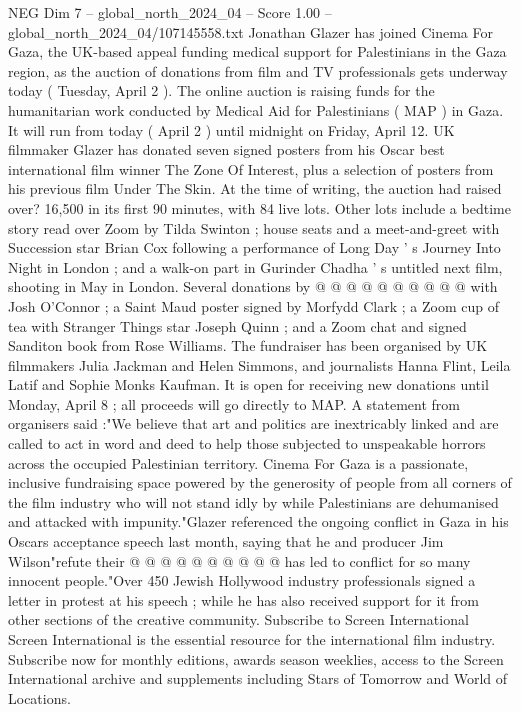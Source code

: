 \begin{textsample}{NEG Dim 7 – global\_north\_2024\_04 – Score 1.00 – global\_north\_2024\_04/107145558.txt}  \label{ex:f7_neg_395}
Jonathan Glazer has joined Cinema For Gaza, the UK-based appeal funding medical support for Palestinians in the Gaza region, as the auction of donations from film and TV professionals gets underway today ( Tuesday, April 2 ).
The online auction is raising funds for the humanitarian work conducted by Medical Aid for Palestinians ( MAP ) in Gaza.
It will run from today ( April 2 ) until midnight on Friday, April 12.
UK filmmaker Glazer has donated seven signed posters from his Oscar best international film winner The Zone Of Interest, plus a selection of posters from his previous film Under The Skin.
At the time of writing, the auction had raised over? 16,500 in its first 90 minutes, with 84 live lots.
Other lots include a bedtime story read over Zoom by Tilda Swinton ; house seats and a meet-and-greet with Succession star Brian Cox following a performance of Long Day ' s Journey Into Night in London ; and a walk-on part in Gurinder Chadha ' s untitled next film, shooting in May in London.
Several donations by @ @ @ @ @ @ @ @ @ @ with Josh O'Connor ; a Saint Maud poster signed by Morfydd Clark ; a Zoom cup of tea with Stranger Things star Joseph Quinn ; and a Zoom chat and signed Sanditon book from Rose Williams.
The fundraiser has been organised by UK filmmakers Julia Jackman and Helen Simmons, and journalists Hanna Flint, Leila Latif and Sophie Monks Kaufman.
It is open for receiving new donations until Monday, April 8 ; all proceeds will go directly to MAP.
A statement from organisers said :"We believe that art and politics are inextricably linked and are called to act in word and deed to help those subjected to unspeakable horrors across the occupied Palestinian territory.
Cinema For Gaza is a passionate, inclusive fundraising space powered by the generosity of people from all corners of the film industry who will not stand idly by while Palestinians are dehumanised and attacked with impunity."Glazer referenced the ongoing conflict in Gaza in his Oscars acceptance speech last month, saying that he and producer Jim Wilson"refute their @ @ @ @ @ @ @ @ @ @ has led to conflict for so many innocent people."Over 450 Jewish Hollywood industry professionals signed a letter in protest at his speech ; while he has also received support for it from other sections of the creative community.
Subscribe to Screen International Screen International is the essential resource for the international film industry.
Subscribe now for monthly editions, awards season weeklies, access to the Screen International archive and supplements including Stars of Tomorrow and World of Locations.

\end{textsample}
